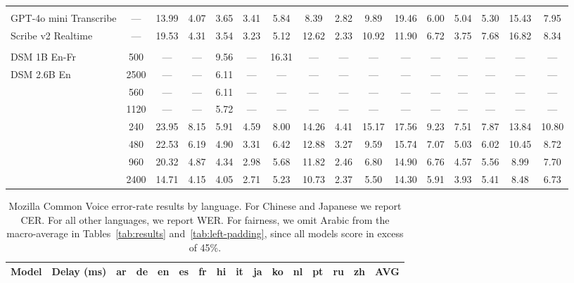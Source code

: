 \begin{landscape}
\begin{table}[h]
\begin{tabular}{lccccccccccccccc}
\addlinespace[0.6em]
\multicolumn{16}{l}{\textit{Realtime API}} \\
\cmidrule(lr){1-16}
GPT-4o mini Transcribe & — & 13.99 & 4.07 & 3.65 & 3.41 & 5.84 & 8.39 & 2.82 & 9.89 & 19.46 & 6.00 & 5.04 & 5.30 & 15.43 & 7.95 \\
Scribe v2 Realtime & — & 19.53 & 4.31 & 3.54 & 3.23 & 5.12 & 12.62 & 2.33 & 10.92 & 11.90 & 6.72 & 3.75 & 7.68 & 16.82 & 8.34 \\

\addlinespace[0.6em]
\multicolumn{16}{l}{\textit{Realtime Open-Source}} \\
\cmidrule(lr){1-16}
DSM 1B En-Fr & 500 & — & — & 9.56 & — & 16.31 & — & — & — & — & — & — & — & — & — \\
DSM 2.6B En & 2500 & — & — & 6.11 & — & — & — & — & — & — & — & — & — & — & — \\
\addlinespace
\multirow[t]{2}{*}{Nemotron Streaming} & 560 & — & — & 6.11 & — & — & — & — & — & — & — & — & — & — & — \\
 & 1120 & — & — & 5.72 & — & — & — & — & — & — & — & — & — & — & — \\
\addlinespace
\multirow[t]{4}{*}{Voxtral Realtime} & 240 & 23.95 & 8.15 & 5.91 & 4.59 & 8.00 & 14.26 & 4.41 & 15.17 & 17.56 & 9.23 & 7.51 & 7.87 & 13.84 & 10.80 \\
 & 480 & 22.53 & 6.19 & 4.90 & 3.31 & 6.42 & 12.88 & 3.27 & 9.59 & 15.74 & 7.07 & 5.03 & 6.02 & 10.45 & 8.72 \\
 & 960 & 20.32 & 4.87 & 4.34 & 2.98 & 5.68 & 11.82 & 2.46 & 6.80 & 14.90 & 6.76 & 4.57 & 5.56 & 8.99 & 7.70 \\
 & 2400 & 14.71 & 4.15 & 4.05 & 2.71 & 5.23 & 10.73 & 2.37 & 5.50 & 14.30 & 5.91 & 3.93 & 5.41 & 8.48 & 6.73 \\
\bottomrule
\end{tabular}
\end{table}


\begin{table}[h]
\centering
\caption{Mozilla Common Voice error-rate results by language. For Chinese and Japanese we report CER. For all other languages, we report WER. For fairness, we omit Arabic from the macro-average in Tables~\ref{tab:results} and~\ref{tab:left-padding}, since all models score in excess of 45\%.}
\label{tab:mcv}
\small
\begin{tabular}{lccccccccccccccc}
\toprule
\textbf{Model} & \textbf{Delay (ms)} & \textbf{ar} & \textbf{de} & \textbf{en} & \textbf{es} & \textbf{fr} & \textbf{hi} & \textbf{it} & \textbf{ja} & \textbf{ko} & \textbf{nl} & \textbf{pt} & \textbf{ru} & \textbf{zh} & \textbf{AVG} \\
\midrule


\end{tabular}
\end{table}
\end{landscape}
